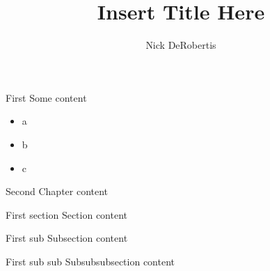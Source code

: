 \documentclass[]{uf-thesis-dissertation}
\title{Insert Title Here}
\author{Nick DeRobertis}
\begin{document}
\begin{chapter}{First}
Some content
\begin{itemize}
\item a
\item b
\item c
\end{itemize}
\end{chapter}
\begin{chapter}{Second}
Chapter content
\begin{section}{First section}
Section content
\begin{subsection}{First sub}
Subsection content
\begin{subsubsection}{First sub sub}
Subsubsubsection content
\end{subsubsection}
\end{subsection}
\end{section}
\end{chapter}
\end{document}
